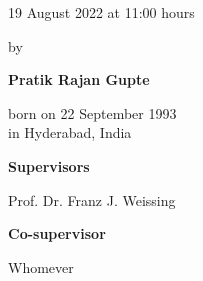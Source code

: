 \begin{titlepage}
\begin{addmargin}[-1cm]{-3cm}
\begin{center}
{            \vspace{3mm}

            19 August 2022 at 11:00 hours

            \vspace{12mm}

            by

            \vspace{12mm}

            \textbf{Pratik Rajan Gupte}

            \vspace{3mm}

            born on 22 September 1993\\
            in Hyderabad, India
        }









    \end{center}

    \pagebreak
    \thispagestyle{empty}

    \textbf{Supervisors}
    \begin{description}
        \item Prof. Dr. Franz J. Weissing
    \end{description}

    \vspace{6mm}

    \textbf{Co-supervisor}
    \begin{description}
        \item Whomever
    \end{description}


\end{addmargin}
\end{titlepage}
